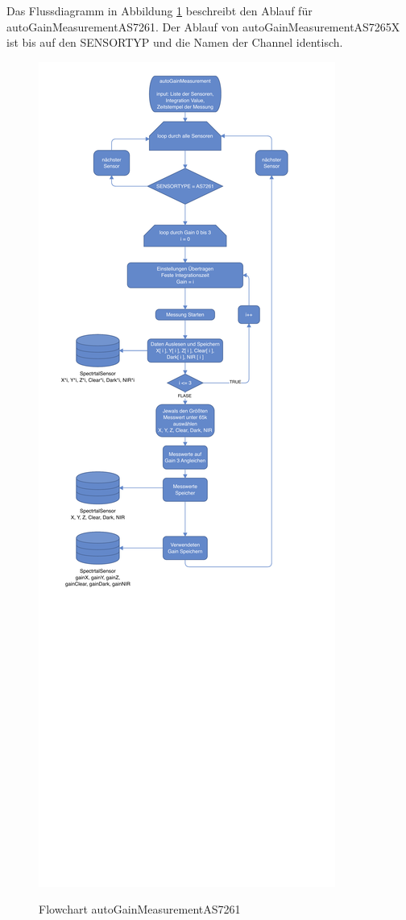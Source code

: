 \noindent Das Flussdiagramm in Abbildung \ref{fig:autoGainMeasurement} beschreibt den Ablauf für autoGainMeasurementAS7261.
Der Ablauf von autoGainMeasurementAS7265X ist bis auf den SENSORTYP und die Namen der Channel identisch.
\begin{figure}[H]
  \centering
    \caption{Flowchart autoGainMeasurementAS7261}
 \includegraphics[width=0.83\linewidth]{img/autoGainMeasurement}
  \label{fig:autoGainMeasurement}
\end{figure}

